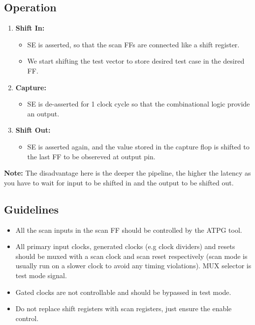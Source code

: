 \documentclass[11pt]{article}
\begin{document}
\subsection*{Operation}
\begin{enumerate}
    \item \textbf{Shift In:}
        \begin{itemize}
            \item SE is asserted, so that the scan FFs are connected like a shift register.
            \item We start shifting the test vector to store desired test case in the desired FF.
        \end{itemize}
    \item \textbf{Capture:}
        \begin{itemize}
            \item SE is de-asserted for 1 clock cycle so that the combinational logic provide an output.
        \end{itemize}
    \item \textbf{Shift Out:}
        \begin{itemize}
            \item SE is asserted again, and the value stored in the capture flop is shifted to the last FF to be obsereved at output pin.
        \end{itemize}
\end{enumerate}
\textbf{Note:} The disadvantage here is the deeper the pipeline, the higher the latency as you have to wait for input to be shifted in and the output to be shifted out.

\subsection*{Guidelines}
\begin{itemize}
    \item All the scan inputs in the scan FF should be controlled by the ATPG tool.
    \item All primary input clocks, generated clocks (e.g clock dividers) and resets should be muxed with a scan clock and scan reset respectively (scan mode is usually run on a slower clock to avoid any timing violations). MUX selector is test mode signal.
    \item Gated clocks are not controllable and should be bypassed in test mode.
    \item Do not replace shift registers with scan registers, just ensure the enable control.
\end{itemize}
\end{document}
